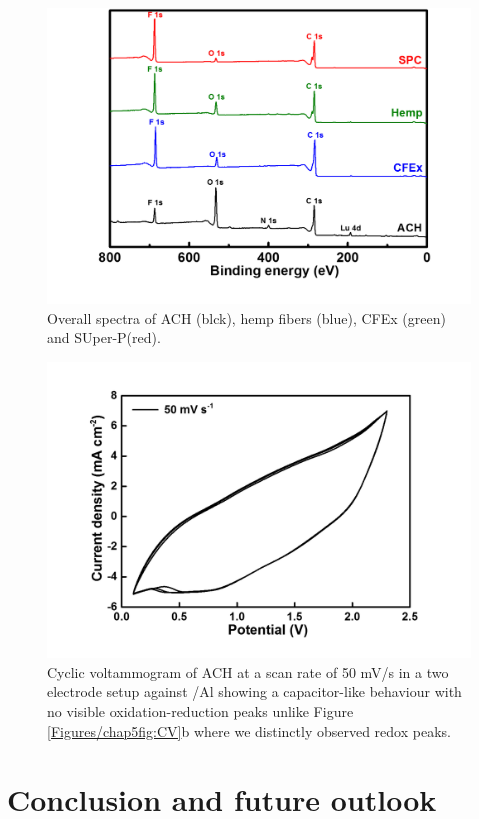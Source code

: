 \begin{figure}[tbh!]
  \centering
  \includegraphics[width=\textwidth]{Figures/chap5fig/xpsoverall}
    \caption{Overall spectra of ACH (blck), hemp fibers (blue), CFEx (green) and SUper-P(red).}
  \label{Figures/chap5fig:xpsoverall}
\end{figure}

\begin{figure}[tbh!]
  \centering
  \includegraphics[width=\textwidth]{Figures/chap5fig/hair50mVs}
    \caption{Cyclic voltammogram of ACH at a scan rate of 50 mV/s in a two electrode setup against /Al showing a capacitor-like behaviour with no visible oxidation-reduction peaks unlike Figure \ref{Figures/chap5fig:CV}b where we distinctly observed redox peaks.}
  \label{Figures/chap5fig:hair50mVs}
\end{figure}

\section{Conclusion and future outlook}

